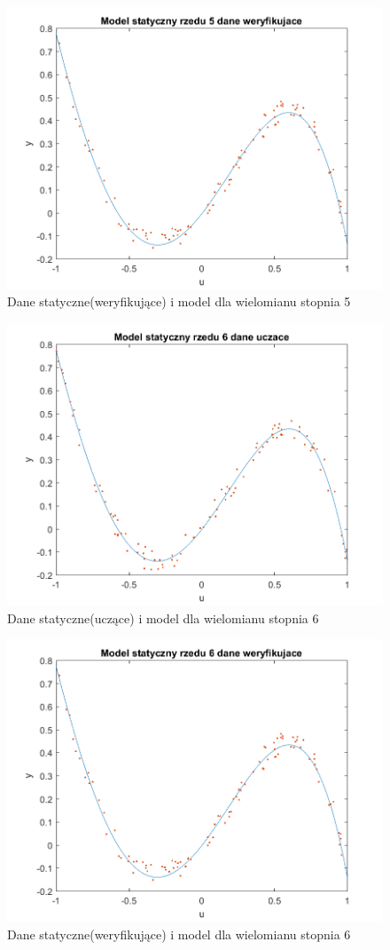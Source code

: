 \documentclass{article}
\begin{document}
\begin{figure}
\centering
\includegraphics[width=0.95\linewidth]{../dane_statyczne/dane_statyczne_model_rzedu_5_weryf}
\caption{Dane statyczne(weryfikujące) i model dla wielomianu stopnia 5}
\label{fig:danestatyczneweryf5}
\end{figure}

\begin{figure}
\centering
\includegraphics[width=0.95\linewidth]{../dane_statyczne/dane_statyczne_model_rzedu_6_uczace}
\caption{Dane statyczne(uczące) i model dla wielomianu stopnia 6}
\label{fig:danestatyczneuczace3}
\end{figure}

\begin{figure}
\centering
\includegraphics[width=0.95\linewidth]{../dane_statyczne/dane_statyczne_model_rzedu_6_weryf}
\caption{Dane statyczne(weryfikujące) i model dla wielomianu stopnia 6}
\label{fig:danestatyczneweryf6}
\end{figure}
\end{document}
